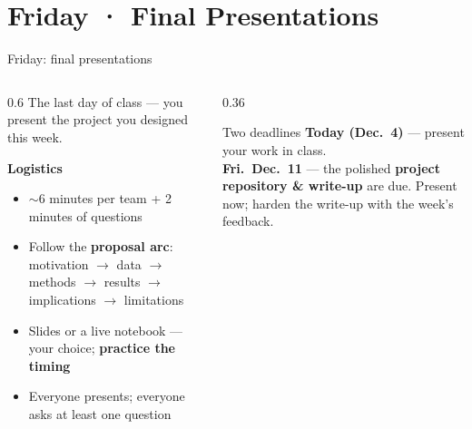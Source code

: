 \documentclass[9pt,aspectratio=169]{beamer}
\begin{document}
\section{Friday · Final Presentations}

\begin{frame}{Friday: final presentations}
    \begin{columns}[T]
        \begin{column}{0.6\textwidth}
            The last day of class --- you present the project you designed this week.

            \vspace{0.8em}

            \textbf{Logistics}
            \begin{itemize}\small
                \item $\sim$6 minutes per team + 2 minutes of questions
                \item Follow the \textbf{proposal arc}: motivation $\to$ data $\to$ methods $\to$ results $\to$ implications $\to$ limitations
                \item Slides or a live notebook --- your choice; \textbf{practice the timing}
                \item Everyone presents; everyone asks at least one question
            \end{itemize}
        \end{column}
        \begin{column}{0.36\textwidth}
            \begin{alertblock}{Two deadlines}
                \footnotesize
                \textbf{Today (Dec.~4)} --- present your work in class.\\[0.4em]
                \textbf{Fri.\ Dec.~11} --- the polished \textbf{project repository \& write-up} are due. Present now; harden the write-up with the week's feedback.
            \end{alertblock}
        \end{column}
    \end{columns}
\end{frame}
\end{document}
